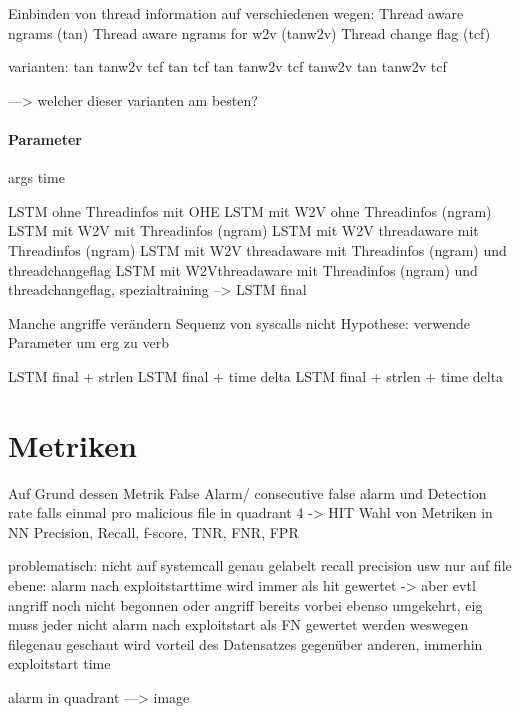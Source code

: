             Einbinden von thread information auf verschiedenen wegen:
            Thread aware ngrams (tan)
            Thread aware ngrams for w2v (tanw2v)
            Thread change flag (tcf)

            varianten:
            tan
            tanw2v
            tcf
            tan tcf
            tan tanw2v
            tcf tanw2v
            tan tanw2v tcf

            ---> welcher dieser varianten am besten?

        \paragraph{Parameter}
            args
            time

            LSTM ohne Threadinfos mit OHE
            LSTM mit W2V ohne Threadinfos (ngram)
            LSTM mit W2V mit Threadinfos (ngram)
            LSTM mit W2V threadaware mit Threadinfos (ngram)
            LSTM mit W2V threadaware mit Threadinfos (ngram) und threadchangeflag
            LSTM mit W2Vthreadaware mit Threadinfos (ngram) und threadchangeflag, spezialtraining
            --> LSTM final

            Manche angriffe verändern Sequenz von syscalls nicht
            Hypothese:
            verwende Parameter um erg zu verb

            LSTM final + strlen
            LSTM final + time delta
            LSTM final + strlen + time delta



\section{Metriken}\label{sec:metrik}

    Auf Grund dessen Metrik False Alarm/ consecutive false alarm und Detection rate falls einmal pro malicious file in quadrant 4 -> HIT
    Wahl von Metriken in NN
    Precision, Recall, f-score, TNR, FNR, FPR

    problematisch:
    nicht auf systemcall genau gelabelt
    recall precision usw nur auf file ebene:
    alarm nach exploitstarttime wird immer als hit gewertet -> aber evtl angriff noch nicht begonnen
    oder angriff bereits vorbei
    ebenso umgekehrt, eig muss jeder nicht alarm nach exploitstart als FN gewertet werden
    weswegen filegenau geschaut wird
    vorteil des Datensatzes gegenüber anderen, immerhin exploitstart time

    alarm in quadrant ---> image
